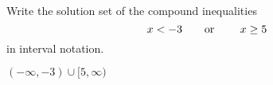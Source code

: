 

Write the solution set of the compound inequalities
\[x<-3 \text{\quad\quad or \quad\quad} x\geq 5 \]
in interval notation.

\begin{solution}
$(-\infty, -3)\cup [5, \infty)$
\end{solution}